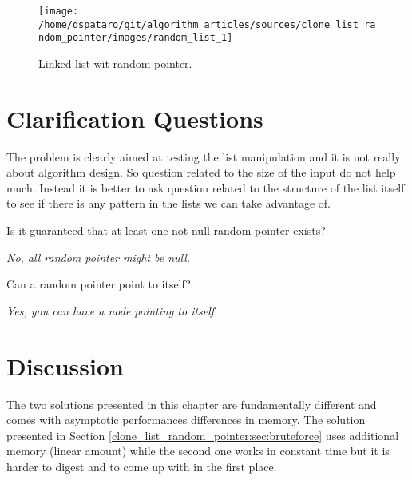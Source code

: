 \begin{figure}
	\label{fig:clone_list_random_pointer:list1}
	\centering
	\texttt{[image: /home/dspataro/git/algorithm\_articles/sources/clone\_list\_random\_pointer/images/random\_list\_1]}
	\caption{Linked list wit random pointer.}
\end{figure}


\section{Clarification Questions}
The problem is clearly aimed at testing the list manipulation and it is not really about algorithm design. So question related to the size of the input do not help much. Instead it is better to ask question related to the structure of the list itself to see if there is any pattern in the lists we can take advantage of.
\begin{QandA}
	\item Is it guaranteed that at least one not-null random pointer exists?
	\begin{answered}
		\textit{No, all random pointer might be null.}
	\end{answered}
	\item Can a random pointer point to itself?
	\begin{answered}
		\textit{Yes, you can have a node pointing to itself.}
	\end{answered}
	
\end{QandA}

\section{Discussion}
\label{clone_list_random_pointer:sec:discussion}
The two solutions presented in this chapter are fundamentally different and comes with asymptotic performances differences in memory.
The solution presented in Section \ref{clone_list_random_pointer:sec:bruteforce} uses additional memory (linear amount) while the second one works in constant time but it is harder to digest and to come up with in the first place.


